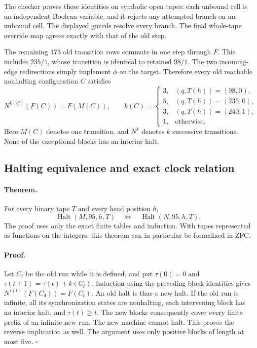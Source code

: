 The checker proves these identities on symbolic open tapes: each unbound
cell is an independent Boolean variable, and it rejects any attempted branch
on an unbound cell.  The displayed guards resolve every branch.  The final
whole-tape override map agrees exactly with that of the old step.

The remaining 473 old transition rows commute in one step through $F$.
This includes $235/1$, whose transition is identical to retained $98/1$.
The two incoming-edge redirections simply implement $\phi$ on the target.
Therefore every old reachable nonhalting configuration $C$ satisfies
\[
 N^{k(C)}(F(C))=F(M(C)),
 \qquad
 k(C)=
 \begin{cases}
 3,&(q,T(h))=(98,0),\\
 5,&(q,T(h))=(235,0),\\
 3,&(q,T(h))=(240,1),\\
 1,&\text{otherwise}.
 \end{cases}
\]
Here $M(C)$ denotes one transition, and $N^k$ denotes $k$ successive
transitions.  None of the exceptional blocks has an interior halt.

\subsection{Halting equivalence and exact clock relation}

\paragraph{Theorem.}
For every binary tape $T$ and every head position $h$,
\[
 \operatorname{Halt}(M,95,h,T)
 \quad\Longleftrightarrow\quad
 \operatorname{Halt}(N,95,h,T).
\]
The proof uses only the exact finite tables and induction.  With tapes
represented as functions on the integers, this theorem can in particular
be formalized in ZFC.

\paragraph{Proof.}
Let $C_t$ be the old run while it is defined, and put $\tau(0)=0$ and
$\tau(t+1)=\tau(t)+k(C_t)$.  Induction using the preceding block identities
gives $N^{\tau(t)}(F(C_0))=F(C_t)$.  An old halt is thus a new halt.
If the old run is infinite, all its synchronization states are nonhalting,
each intervening block has no interior halt, and $\tau(t)\ge t$.
The new blocks consequently cover every finite prefix of an infinite new
run.  The new machine cannot halt.  This proves the reverse implication
as well.  The argument uses only positive blocks of length at most five.
\hfill$\square$

